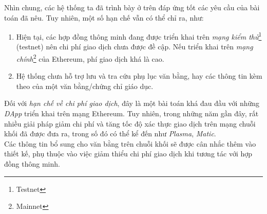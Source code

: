 Nhìn chung, các hệ thống ta đã trình bày ở trên đáp ứng tốt các yêu cầu của bài toán đã nêu. Tuy nhiên, một số hạn chế vẫn có thể chỉ ra, như:
\begin{enumerate}
    \item Hiện tại, các hợp đồng thông minh đang được triển khai trên \textit{mạng kiểm thử}\footnote{Testnet} (testnet) nên chi phí giao dịch chưa được đề cập. Nếu triển khai trên \textit{mạng chính}\footnote{Mainnet} của Ethereum, phí giao dịch khá là cao.\label{cons/transaction-fee}
    \item Hệ thống chưa hỗ trợ lưu và tra cứu phụ lục văn bằng, hay các thông tin kèm theo của một văn bằng/chứng chỉ giáo dục.
\end{enumerate}

Đối với \textit{hạn chế về chi phí giao dịch}, đây là một bài toán khá đau đầu với những \textit{DApp} triển khai trên mạng Ethereum. Tuy nhiên, trong những năm gần đây, rất nhiều giải pháp giảm chi phí và tăng tốc độ xác thực giao dịch trên mạng chuỗi khối đã được đưa ra, trong số đó có thể kể đến như \textit{Plasma}, \textit{Matic}.\\

Các thông tin bổ sung cho văn bằng trên chuỗi khối sẽ được cân nhắc thêm vào thiết kế, phụ thuộc vào việc giảm thiểu chi phí giao dịch khi tương tác với hợp đồng thông minh.
